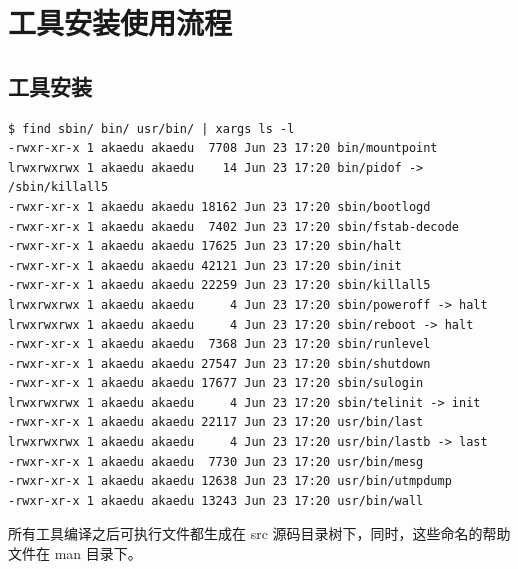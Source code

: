 \section{工具安装使用流程}

\subsection{工具安装}

{\begin{shaded}\begin{verbatim}
$ find sbin/ bin/ usr/bin/ | xargs ls -l
-rwxr-xr-x 1 akaedu akaedu  7708 Jun 23 17:20 bin/mountpoint
lrwxrwxrwx 1 akaedu akaedu    14 Jun 23 17:20 bin/pidof -> /sbin/killall5
-rwxr-xr-x 1 akaedu akaedu 18162 Jun 23 17:20 sbin/bootlogd
-rwxr-xr-x 1 akaedu akaedu  7402 Jun 23 17:20 sbin/fstab-decode
-rwxr-xr-x 1 akaedu akaedu 17625 Jun 23 17:20 sbin/halt
-rwxr-xr-x 1 akaedu akaedu 42121 Jun 23 17:20 sbin/init
-rwxr-xr-x 1 akaedu akaedu 22259 Jun 23 17:20 sbin/killall5
lrwxrwxrwx 1 akaedu akaedu     4 Jun 23 17:20 sbin/poweroff -> halt
lrwxrwxrwx 1 akaedu akaedu     4 Jun 23 17:20 sbin/reboot -> halt
-rwxr-xr-x 1 akaedu akaedu  7368 Jun 23 17:20 sbin/runlevel
-rwxr-xr-x 1 akaedu akaedu 27547 Jun 23 17:20 sbin/shutdown
-rwxr-xr-x 1 akaedu akaedu 17677 Jun 23 17:20 sbin/sulogin
lrwxrwxrwx 1 akaedu akaedu     4 Jun 23 17:20 sbin/telinit -> init
-rwxr-xr-x 1 akaedu akaedu 22117 Jun 23 17:20 usr/bin/last
lrwxrwxrwx 1 akaedu akaedu     4 Jun 23 17:20 usr/bin/lastb -> last
-rwxr-xr-x 1 akaedu akaedu  7730 Jun 23 17:20 usr/bin/mesg
-rwxr-xr-x 1 akaedu akaedu 12638 Jun 23 17:20 usr/bin/utmpdump
-rwxr-xr-x 1 akaedu akaedu 13243 Jun 23 17:20 usr/bin/wall
\end{verbatim}\end{shaded}}
所有工具编译之后可执行文件都生成在 src
源码目录树下，同时，这些命名的帮助文件在 man 目录下。

